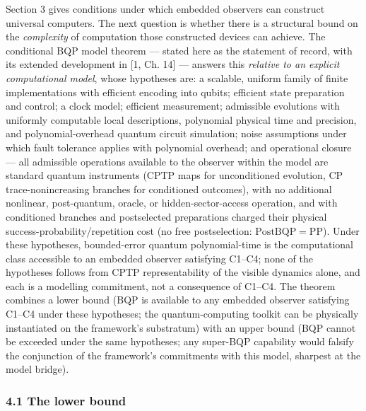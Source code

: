 \documentclass[
]{article}
\begin{document}
Section 3 gives conditions under which embedded observers can construct
universal computers. The next question is whether there is a structural
bound on the \emph{complexity} of computation those constructed devices
can achieve. The conditional BQP model theorem --- stated here as the
statement of record, with its extended development in {[}1, Ch. 14{]}
--- answers this \emph{relative to an explicit computational model},
whose hypotheses are: a scalable, uniform family of finite
implementations with efficient encoding into qubits; efficient state
preparation and control; a clock model; efficient measurement;
admissible evolutions with uniformly computable local descriptions,
polynomial physical time and precision, and polynomial-overhead quantum
circuit simulation; noise assumptions under which fault tolerance
applies with polynomial overhead; and operational closure --- all
admissible operations available to the observer within the model are
standard quantum instruments (CPTP maps for unconditioned evolution, CP
trace-nonincreasing branches for conditioned outcomes), with no
additional nonlinear, post-quantum, oracle, or hidden-sector-access
operation, and with conditioned branches and postselected preparations
charged their physical success-probability/repetition cost (no free
postselection: \(\mathrm{PostBQP} = \mathrm{PP}\)). Under these
hypotheses, bounded-error quantum polynomial-time is the computational
class accessible to an embedded observer satisfying C1--C4; none of the
hypotheses follows from CPTP representability of the visible dynamics
alone, and each is a modelling commitment, not a consequence of C1--C4.
The theorem combines a lower bound (BQP is available to any embedded
observer satisfying C1--C4 under these hypotheses; the quantum-computing
toolkit can be physically instantiated on the framework's substratum)
with an upper bound (BQP cannot be exceeded under the same hypotheses;
any super-BQP capability would falsify the conjunction of the
framework's commitments with this model, sharpest at the model bridge).

\hypertarget{the-lower-bound}{%
\subsubsection{4.1 The lower bound}\label{the-lower-bound}}
\end{document}
